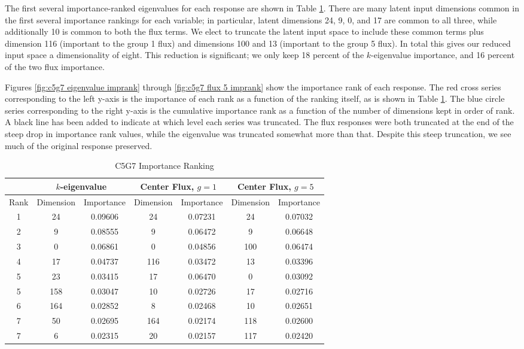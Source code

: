 The first several importance-ranked eigenvalues
for each response are shown in Table \ref{tab:c5g7 importance}.  There are many latent input dimensions common
in the first several importance rankings for each variable; in particular, latent dimensions 24, 9, 0, and 17
are common to all three, while additionally 10 is common to both the flux terms.  We elect to truncate the
latent input space to include these common terms plus dimension 116 (important to the group 1 flux) and
dimensions 100 and 13 (important to the group 5 flux).  In total this gives our reduced input space a
dimensionality of eight.  This reduction is significant; we only keep 18 percent of the $k$-eigenvalue
importance, and 16 percent of the two flux importance.  

Figures \ref{fig:c5g7 eigenvalue imprank} through
\ref{fig:c5g7 flux 5 imprank} show the importance rank of each response.  The red cross series corresponding
to the left y-axis is the importance of each rank as a function of the ranking itself, as is shown in Table
\ref{tab:c5g7 importance}.  The blue circle series corresponding to the right y-axis is the cumulative
importance rank as a function of the number of dimensions kept in order of rank.  A black line has been added
to indicate at which level each series was truncated.  The flux responses were both truncated at the end of
the steep drop in importance rank values, while the eigenvalue was truncated somewhat more than that.  Despite
this steep truncation, we see much of the original response preserved.

\begin{table}
  \centering
  \begin{tabular}{|c|c c|c c|c c|} \hline
    & \multicolumn{2}{|c|}{$k$-eigenvalue} & \multicolumn{2}{|c|}{Center Flux, $g=1$} &
             \multicolumn{2}{|c|}{Center Flux, $g=5$} \\ \hline
    Rank & Dimension & Importance & Dimension & Importance & Dimension & Importance \\ \hline 
    1 &  24 & 0.09606 &  24 & 0.07231 &  24 &  0.07032  \\
    2 &   9 & 0.08555 &   9 & 0.06472 &   9 &  0.06648  \\
    3 &   0 & 0.06861 &   0 & 0.04856 & 100 &  0.06474  \\
    4 &  17 & 0.04737 & 116 & 0.03472 &  13 &  0.03396  \\
    5 &  23 & 0.03415 &  17 & 0.06470 &   0 &  0.03092  \\
    5 & 158 & 0.03047 &  10 & 0.02726 &  17 &  0.02716  \\
    6 & 164 & 0.02852 &   8 & 0.02468 &  10 &  0.02651  \\
    7 &  50 & 0.02695 & 164 & 0.02174 & 118 &  0.02600  \\
    7 &   6 & 0.02315 &  20 & 0.02157 & 117 &  0.02420  \\
  \hline \end{tabular}
  \caption{C5G7 Importance Ranking}
  \label{tab:c5g7 importance}
\end{table}

